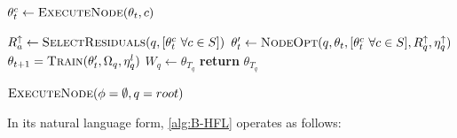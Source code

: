 \begin{algorithm}[H]
\begin{onehalfspace}
\begin{algorithmic}[1]
             \label{alg:B-HFL:line:11}
            \State $\theta_t^c \gets \Call{ExecuteNode}{\theta_t, c} $  \label{alg:B-HFL:line:12}

            \EndFor

             \label{alg:B-HFL:line:13}
            \State $ R^\uparrow_a \gets \Call{SelectResiduals}{q,[\theta^c_t \,\, \forall c \in S]}$ \label{alg:B-HFL:line:14}
            \EndFor
            \State $\theta_t^\prime \gets \Call{NodeOpt}{q,\theta_t, [\theta^c_t \,\, \forall c \in S], R^\uparrow_q, \eta^{\uparrow}_q}  $  \label{alg:B-HFL:line:15}
            \State $\theta_{t+1} = \Call{Train}{\theta_{t}^\prime,\Omega_q, \eta^l_q}$  \label{alg:B-HFL:line:7}
            \EndFor
            \State $W_q \gets \theta_{T_q}$  \label{alg:B-HFL:line:16}
            \State \textbf{return} $\theta_{T_q}$ \label{alg:B-HFL:line:17}
            \EndProcedure

            \State $\Call{ExecuteNode}{\phi = \emptyset, q = root}$
        \end{algorithmic}
    \end{onehalfspace}
\end{algorithm}
\noindent In its natural language form, \cref{alg:B-HFL} operates as follows:
